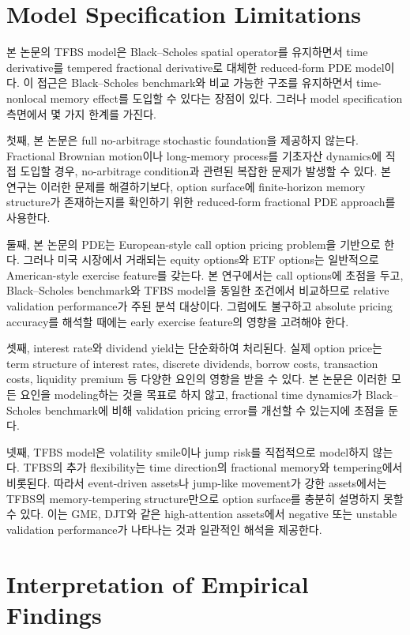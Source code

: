 \documentclass[11pt,a4paper]{report}
\begin{document}
\section{Model Specification Limitations}

본 논문의 TFBS model은 Black--Scholes spatial operator를 유지하면서 time derivative를 tempered fractional derivative로 대체한 reduced-form PDE model이다. 이 접근은 Black--Scholes benchmark와 비교 가능한 구조를 유지하면서 time-nonlocal memory effect를 도입할 수 있다는 장점이 있다. 그러나 model specification 측면에서 몇 가지 한계를 가진다.

첫째, 본 논문은 full no-arbitrage stochastic foundation을 제공하지 않는다. Fractional Brownian motion이나 long-memory process를 기초자산 dynamics에 직접 도입할 경우, no-arbitrage condition과 관련된 복잡한 문제가 발생할 수 있다. 본 연구는 이러한 문제를 해결하기보다, option surface에 finite-horizon memory structure가 존재하는지를 확인하기 위한 reduced-form fractional PDE approach를 사용한다.

둘째, 본 논문의 PDE는 European-style call option pricing problem을 기반으로 한다. 그러나 미국 시장에서 거래되는 equity options와 ETF options는 일반적으로 American-style exercise feature를 갖는다. 본 연구에서는 call options에 초점을 두고, Black--Scholes benchmark와 TFBS model을 동일한 조건에서 비교하므로 relative validation performance가 주된 분석 대상이다. 그럼에도 불구하고 absolute pricing accuracy를 해석할 때에는 early exercise feature의 영향을 고려해야 한다.

셋째, interest rate와 dividend yield는 단순화하여 처리된다. 실제 option price는 term structure of interest rates, discrete dividends, borrow costs, transaction costs, liquidity premium 등 다양한 요인의 영향을 받을 수 있다. 본 논문은 이러한 모든 요인을 modeling하는 것을 목표로 하지 않고, fractional time dynamics가 Black--Scholes benchmark에 비해 validation pricing error를 개선할 수 있는지에 초점을 둔다.

넷째, TFBS model은 volatility smile이나 jump risk를 직접적으로 model하지 않는다. TFBS의 추가 flexibility는 time direction의 fractional memory와 tempering에서 비롯된다. 따라서 event-driven assets나 jump-like movement가 강한 assets에서는 TFBS의 memory-tempering structure만으로 option surface를 충분히 설명하지 못할 수 있다. 이는 GME, DJT와 같은 high-attention assets에서 negative 또는 unstable validation performance가 나타나는 것과 일관적인 해석을 제공한다.

\section{Interpretation of Empirical Findings}
\end{document}
